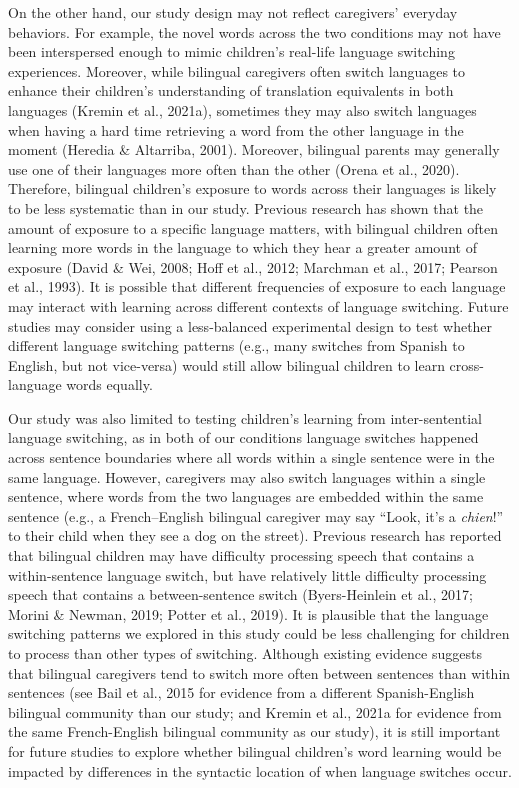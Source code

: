 \documentclass[
  man,floatsintext]{apa7}
\begin{document}
On the other hand, our study design may not reflect caregivers' everyday behaviors. For example, the novel words across the two conditions may not have been interspersed enough to mimic children's real-life language switching experiences. Moreover, while bilingual caregivers often switch languages to enhance their children's understanding of translation equivalents in both languages (Kremin et al., 2021a), sometimes they may also switch languages when having a hard time retrieving a word from the other language in the moment (Heredia \& Altarriba, 2001). Moreover, bilingual parents may generally use one of their languages more often than the other (Orena et al., 2020). Therefore, bilingual children's exposure to words across their languages is likely to be less systematic than in our study. Previous research has shown that the amount of exposure to a specific language matters, with bilingual children often learning more words in the language to which they hear a greater amount of exposure (David \& Wei, 2008; Hoff et al., 2012; Marchman et al., 2017; Pearson et al., 1993). It is possible that different frequencies of exposure to each language may interact with learning across different contexts of language switching. Future studies may consider using a less-balanced experimental design to test whether different language switching patterns (e.g., many switches from Spanish to English, but not vice-versa) would still allow bilingual children to learn cross-language words equally.

Our study was also limited to testing children's learning from inter-sentential language switching, as in both of our conditions language switches happened across sentence boundaries where all words within a single sentence were in the same language. However, caregivers may also switch languages within a single sentence, where words from the two languages are embedded within the same sentence (e.g., a French--English bilingual caregiver may say ``Look, it's a \emph{chien}!'' to their child when they see a dog on the street). Previous research has reported that bilingual children may have difficulty processing speech that contains a within-sentence language switch, but have relatively little difficulty processing speech that contains a between-sentence switch (Byers-Heinlein et al., 2017; Morini \& Newman, 2019; Potter et al., 2019). It is plausible that the language switching patterns we explored in this study could be less challenging for children to process than other types of switching. Although existing evidence suggests that bilingual caregivers tend to switch more often between sentences than within sentences (see Bail et al., 2015 for evidence from a different Spanish-English bilingual community than our study; and Kremin et al., 2021a for evidence from the same French-English bilingual community as our study), it is still important for future studies to explore whether bilingual children's word learning would be impacted by differences in the syntactic location of when language switches occur.
\end{document}
